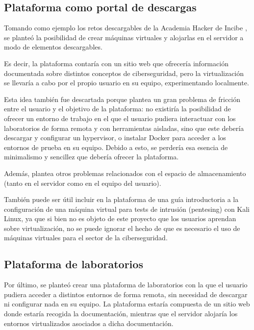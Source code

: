         \subsection{Plataforma como portal de descargas}

            Tomando como ejemplo los retos descargables de la Academia Hacker de Incibe \cite{retos-INCIBE}, se planteó la posibilidad de crear máquinas virtuales y alojarlas en el servidor a modo de elementos descargables.
            
            Es decir, la plataforma contaría con un sitio web que ofrecería información documentada sobre distintos conceptos de ciberseguridad, pero la virtualización se llevaría a cabo por el propio usuario en su equipo, experimentando localmente.

            Esta idea también fue descartada porque plantea un gran problema de fricción entre el usuario y el objetivo de la plataforma: no existiría la posibilidad de ofrecer un entorno de trabajo en el que el usuario pudiera interactuar con los laboratorios de forma remota y con herramientas aisladas, sino que este debería descargar y configurar un hypervisor, o instalar Docker para acceder a los entornos de prueba en su equipo. Debido a esto, se perdería esa esencia de minimalismo y sencillez que debería ofrecer la plataforma.
            
            Además, plantea otros problemas relacionados con el espacio de almacenamiento (tanto en el servidor como en el equipo del usuario).
            
            También puede ser útil incluir en la plataforma de una guía introductoria a la configuración de una máquina virtual para tests de intrusión (pentesing) con Kali Linux, ya que si bien no es objeto de este proyecto que los usuarios aprendan sobre virtualización, no se puede ignorar el hecho de que es necesario el uso de máquinas virtuales para el sector de la ciberseguridad.

        \subsection{Plataforma de laboratorios}

            Por último, se planteó crear una plataforma de laboratorios con la que el usuario pudiera acceder a distintos entornos de forma remota, sin necesidad de descargar ni configurar nada en su equipo. La plataforma estaría compuesta de un sitio web donde estaría recogida la documentación, mientras que el servidor alojaría los entornos virtualizados asociados a dicha documentación.
            
